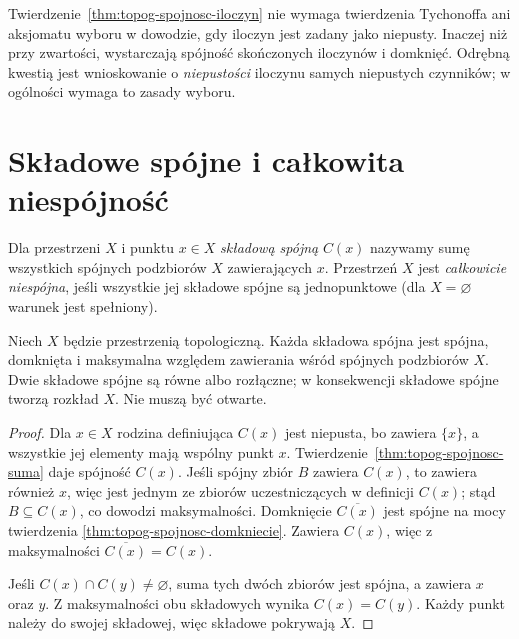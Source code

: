 \begin{uwaga}
\label{rem:topog-spojnosc-tychonoff}
Twierdzenie~\ref{thm:topog-spojnosc-iloczyn}
nie wymaga twierdzenia Tychonoffa ani
aksjomatu wyboru w dowodzie, gdy iloczyn
jest zadany jako niepusty. Inaczej niż przy
zwartości, wystarczają spójność skończonych
iloczynów i domknięć. Odrębną kwestią jest
wnioskowanie o \emph{niepustości} iloczynu
samych niepustych czynników; w ogólności
wymaga to zasady wyboru.
\end{uwaga}

\section{Składowe spójne i całkowita niespójność}
\label{sec:topog-spojnosc-skladowe}

\begin{definicja}
\label{def:topog-spojnosc-skladowa}
Dla przestrzeni $X$ i punktu $x\in X$
\emph{składową spójną} $C(x)$ nazywamy sumę
wszystkich spójnych podzbiorów $X$
zawierających $x$.
Przestrzeń $X$ jest \emph{całkowicie niespójna},
jeśli wszystkie jej składowe spójne są
jednopunktowe (dla $X=\varnothing$ warunek
jest spełniony).
\end{definicja}

\begin{twierdzenie}
\label{thm:topog-spojnosc-skladowe}
Niech $X$ będzie przestrzenią topologiczną.
Każda składowa spójna jest spójna, domknięta
i maksymalna względem zawierania wśród
spójnych podzbiorów $X$. Dwie składowe
spójne są równe albo rozłączne; w konsekwencji
składowe spójne tworzą rozkład $X$.
Nie muszą być otwarte.
\end{twierdzenie}
\begin{proof}
Dla $x\in X$ rodzina definiująca $C(x)$
jest niepusta, bo zawiera $\{x\}$,
a wszystkie jej elementy mają wspólny punkt
$x$. Twierdzenie~\ref{thm:topog-spojnosc-suma}
daje spójność $C(x)$. Jeśli spójny zbiór
$B$ zawiera $C(x)$, to zawiera również $x$,
więc jest jednym ze zbiorów uczestniczących
w definicji $C(x)$; stąd $B\subseteq C(x)$,
co dowodzi maksymalności.
Domknięcie $\overline{C(x)}$ jest spójne
na mocy twierdzenia
\ref{thm:topog-spojnosc-domkniecie}.
Zawiera $C(x)$, więc z maksymalności
$\overline{C(x)}=C(x)$.

Jeśli $C(x)\cap C(y)\ne\varnothing$, suma
tych dwóch zbiorów jest spójna, a zawiera
$x$ oraz $y$. Z maksymalności obu składowych
wynika $C(x)=C(y)$. Każdy punkt należy do
swojej składowej, więc składowe pokrywają $X$.
\end{proof}

